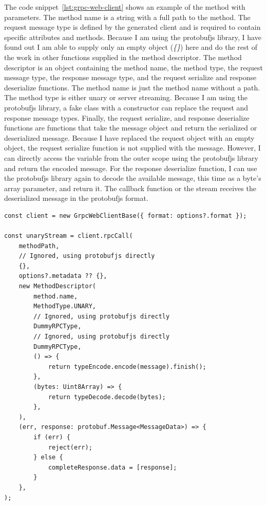 The code snippet~\ref{lst:grpc-web-client} shows an example of the method with parameters.
The method name is a string with a full path to the method.
The request message type is defined by the generated client and is required to contain specific attributes and methods.
Because I am using the protobufjs library, I have found out I am able to supply only an empty object (\textit{\{\}}) here and do the rest of the work in other functions supplied in the method descriptor.
The method descriptor is an object containing the method name, the method type, the request message type, the response message type, and the request serialize and response deserialize functions.
The method name is just the method name without a path.
The method type is either unary or server streaming.
Because I am using the protobufjs library, a fake class with a constructor can replace the request and response message types.
Finally, the request serialize, and response deserialize functions are functions that take the message object and return the serialized or deserialized message.
Because I have replaced the request object with an empty object, the request serialize function is not supplied with the message.
However, I can directly access the variable from the outer scope using the protobufjs library and return the encoded message.
For the response deserialize function, I can use the protobufjs library again to decode the available message, this time as a byte's array parameter, and return it.
The callback function or the stream receives the deserialized message in the protobufjs format.

\begin{lstlisting}[style=JavaScript, caption={gRPC-Web extracted client unary call example}, label={lst:grpc-web-client}]
const client = new GrpcWebClientBase({ format: options?.format });

const unaryStream = client.rpcCall(
    methodPath,
    // Ignored, using protobufjs directly
    {},
    options?.metadata ?? {},
    new MethodDescriptor(
        method.name,
        MethodType.UNARY,
        // Ignored, using protobufjs directly
        DummyRPCType,
        // Ignored, using protobufjs directly
        DummyRPCType,
        () => {
            return typeEncode.encode(message).finish();
        },
        (bytes: Uint8Array) => {
            return typeDecode.decode(bytes);
        },
    ),
    (err, response: protobuf.Message<MessageData>) => {
        if (err) {
            reject(err);
        } else {
            completeResponse.data = [response];
        }
    },
);
\end{lstlisting}


